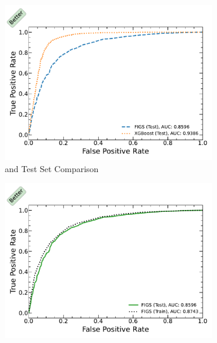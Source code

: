 \begin{figure}[H]
  \centering
  \begin{subfigure}[b]{0.75\textwidth}\centering
      \includegraphics[width=\textwidth]{figures/ml/figs_demo/roc_figs_test_xgboost_test}
  \caption{\figs and \xgboost Test Set Comparison}
  \label{fig:FIGS:demo_roc:figs_xgboost}
  \end{subfigure}
  \newline
  \begin{subfigure}[b]{0.48\textwidth}\centering
      \includegraphics[width=\textwidth]{figures/ml/figs_demo/roc_figs_test_train}
  \caption{\figs}
  \label{fig:FIGS:demo_roc:figs}
  \end{subfigure}
  ~

\end{figure}
